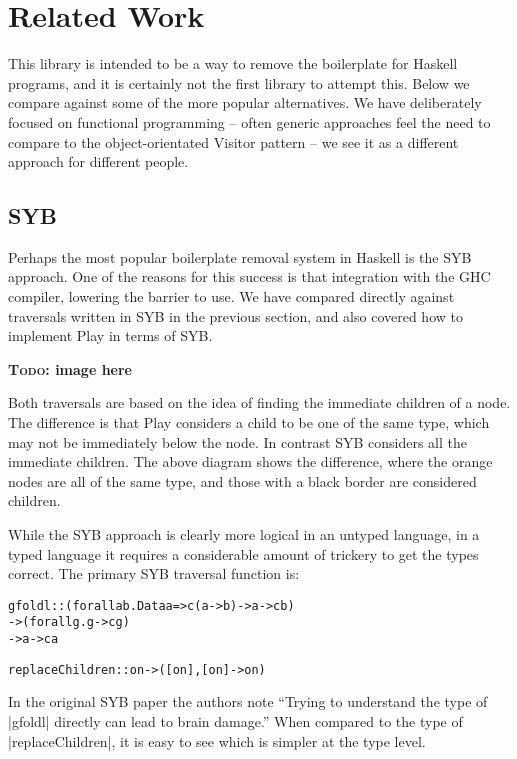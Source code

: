 \documentclass[preprint]{sigplanconf}
\newcommand{\todo}[1]{\textbf{\textsc{Todo:} #1}}
\newenvironment{code}{\begin{alltt}\small}{\end{alltt}}
\begin{document}
\section{Related Work}

This library is intended to be a way to remove the boilerplate for Haskell programs, and it is certainly not the first library to attempt this. Below we compare against some of the more popular alternatives. We have deliberately focused on functional programming -- often generic approaches feel the need to compare to the object-orientated Visitor pattern -- we see it as a different approach for different people.

\subsection{SYB}

Perhaps the most popular boilerplate removal system in Haskell is the SYB approach. One of the reasons for this success is that integration with the GHC compiler, lowering the barrier to use. We have compared directly against traversals written in SYB in the previous section, and also covered how to implement Play in terms of SYB.

\todo{image here}

Both traversals are based on the idea of finding the immediate children of a node. The difference is that Play considers a child to be one of the same type, which may not be immediately below the node. In contrast SYB considers all the immediate children. The above diagram shows the difference, where the orange nodes are all of the same type, and those with a black border are considered children.

While the SYB approach is clearly more logical in an untyped language, in a typed language it requires a considerable amount of trickery to get the types correct. The primary SYB traversal function is:

\begin{code}
gfoldl  ::  (forall a b . Data a => c (a -> b) -> a -> c b)
        ->  (forall g . g -> c g)
        ->  a -> c a

replaceChildren :: on -> ([on], [on] -> on)
\end{code}

In the original SYB paper the authors note ``Trying to understand the type of |gfoldl| directly can lead to brain damage.'' When compared to the type of |replaceChildren|, it is easy to see which is simpler at the type level.
\end{document}
